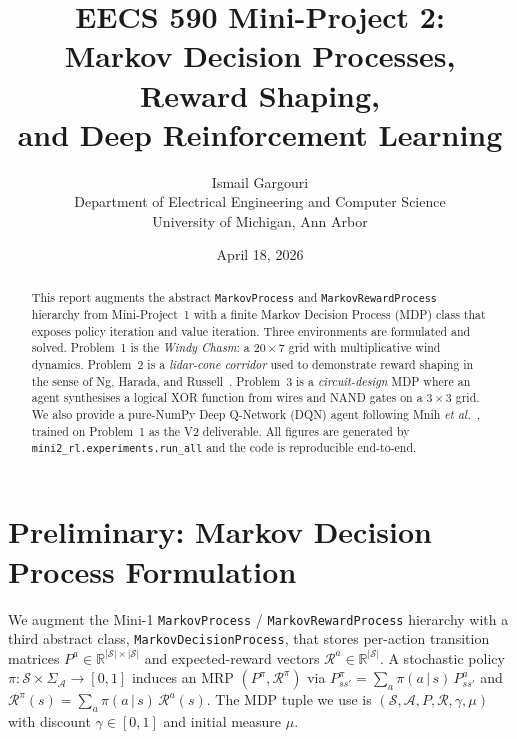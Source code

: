 \documentclass[11pt,letterpaper]{article}
\title{\vspace{-1cm}\textbf{EECS 590 Mini-Project 2: \\ Markov Decision Processes, Reward Shaping, \\ and Deep Reinforcement Learning}}
\author{Ismail Gargouri \\ Department of Electrical Engineering and Computer Science \\ University of Michigan, Ann Arbor}
\date{April 18, 2026}
\newcommand{\R}{\mathbb{R}}
\newcommand{\calS}{\mathcal{S}}
\newcommand{\calA}{\mathcal{A}}
\newcommand{\calR}{\mathcal{R}}
\newcommand{\transP}{P}
\begin{document}
\maketitle
\begin{abstract}
This report augments the abstract \texttt{MarkovProcess} and \texttt{MarkovRewardProcess} hierarchy from Mini-Project~1 with a finite Markov Decision Process (MDP) class that exposes policy iteration and value iteration. Three environments are formulated and solved. Problem~1 is the \emph{Windy Chasm}: a $20\times 7$ grid with multiplicative wind dynamics. Problem~2 is a \emph{lidar-cone corridor} used to demonstrate reward shaping in the sense of Ng, Harada, and Russell~\cite{ng1999policy}. Problem~3 is a \emph{circuit-design} MDP where an agent synthesises a logical XOR function from wires and NAND gates on a $3\times 3$ grid. We also provide a pure-NumPy Deep Q-Network (DQN) agent following Mnih \emph{et al.}~\cite{mnih2015human}, trained on Problem~1 as the V2 deliverable. All figures are generated by \texttt{mini2\_rl.experiments.run\_all} and the code is reproducible end-to-end.
\end{abstract}

\section{Preliminary: Markov Decision Process Formulation}\label{sec:prelim}
We augment the Mini-1 \texttt{MarkovProcess} / \texttt{MarkovRewardProcess} hierarchy with a third abstract class, \texttt{MarkovDecisionProcess}, that stores per-action transition matrices $P^{a}\in\R^{|\calS|\times|\calS|}$ and expected-reward vectors $\calR^{a}\in\R^{|\calS|}$. A stochastic policy $\pi\colon \calS\times\Sigma_{\calA}\to[0,1]$ induces an MRP $(P^{\pi},\calR^{\pi})$ via $P^{\pi}_{ss'}=\sum_{a}\pi(a\,|\,s)\,P^{a}_{ss'}$ and $\calR^{\pi}(s)=\sum_{a}\pi(a\,|\,s)\,\calR^{a}(s)$. The MDP tuple we use is $(\calS,\calA,\transP,\calR,\gamma,\mu)$ with discount $\gamma\in[0,1]$ and initial measure $\mu$.
\end{document}

